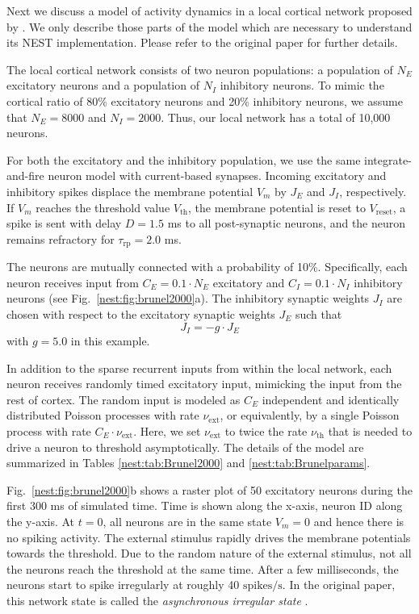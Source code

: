 \documentclass{article}
\begin{document}
Next we discuss a model of activity dynamics in a local cortical
network proposed by \citet{Brunel00}. We only describe those parts of
the model which are necessary to understand its NEST
implementation. Please refer to the original paper for further details.

The local cortical network consists of two neuron populations: a
population of $N_E$ excitatory neurons and a population of $N_I$
inhibitory neurons. To mimic the cortical ratio of 80\% excitatory neurons
and 20\% inhibitory neurons, we assume that $N_E=8000$ and $N_I=2000$. Thus,
our local network has a total of 10,000 neurons.

For both the excitatory and the inhibitory population, we use the same
integrate-and-fire neuron model with current-based synapses. Incoming
excitatory and inhibitory spikes displace the membrane potential $V_m$
by $J_{E}$ and $J_I$, respectively. If $V_m$ reaches the threshold
value $V_{\text{th}}$, the membrane potential is reset to $V_{\text{reset}}$,
a spike is sent with delay $D=1.5$ ms to all post-synaptic
neurons, and the neuron remains refractory for $\tau_{\text{rp}}=2.0$ ms.

The neurons are mutually connected with a probability of
10\%. Specifically, each neuron receives input from $C_{E}= 0.1 \cdot
N_{E}$ excitatory and $C_I= 0.1 \cdot N_{I}$ inhibitory neurons (see
Fig.~\ref{nest:fig:brunel2000}a). The inhibitory synaptic weights
$J_I$ are chosen with respect to the excitatory synaptic weights $J_E$
such that
\begin{equation}
J_I = -g \cdot J_E
\end{equation}
with $g=5.0$ in this example.

In addition to the sparse recurrent inputs from within the local
network, each neuron receives randomly timed excitatory input, mimicking 
the input from the rest of cortex. The random input is modeled as $C_E$
independent and identically distributed Poisson processes with rate
$\nu_{\text{ext}}$, or equivalently, by a single Poisson process with rate 
$C_E \cdot \nu_{\text{ext}}$. Here, we set $\nu_{\text{ext}}$ to twice the 
rate $\nu_{\text{th}}$ that is needed to drive a neuron to threshold 
asymptotically. The details of the model are summarized in Tables
\ref{nest:tab:Brunel2000} and \ref{nest:tab:Brunelparams}.

Fig.~\ref{nest:fig:brunel2000}b shows a raster plot of 50
excitatory neurons during the first 300 ms of simulated time. Time is
shown along the x-axis, neuron ID along the y-axis. At $t=0$, all
neurons are in the same state $V_m=0$ and hence there is no spiking
activity. The external stimulus rapidly drives the membrane potentials
towards the threshold. Due to the random nature of the external
stimulus, not all the neurons reach the threshold at the same
time. After a few milliseconds, the neurons start to spike irregularly at
roughly 40 $\mathrm{spikes/s}$. In the original paper, this network
state is called the \emph{asynchronous irregular state} \citep{Brunel00}.
\end{document}
